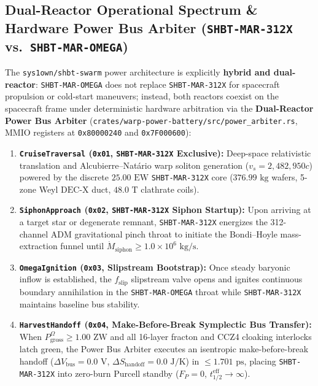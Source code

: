 \documentclass[11pt,onecolumn]{article}
\begin{document}
\subsection{Dual-Reactor Operational Spectrum \& Hardware Power Bus Arbiter (\texttt{SHBT-MAR-312X} vs.\ \texttt{SHBT-MAR-OMEGA})}
\label{sec:dual_reactor_arbiter}

The \texttt{sys1own/shbt-swarm} power architecture is explicitly \textbf{hybrid and dual-reactor}: \texttt{SHBT-MAR-OMEGA} does not replace \texttt{SHBT-MAR-312X} for spacecraft propulsion or cold-start maneuvers; instead, both reactors coexist on the spacecraft frame under deterministic hardware arbitration via the \textbf{Dual-Reactor Power Bus Arbiter} (\texttt{crates/warp-power-battery/src/power\_arbiter.rs}, MMIO registers at \texttt{0x80000240} and \texttt{0x7F000600}):
\begin{enumerate}
    \item \textbf{\texttt{CruiseTraversal} (\texttt{0x01}, \texttt{SHBT-MAR-312X} Exclusive):} Deep-space relativistic translation and Alcubierre--Nat\'ario warp soliton generation ($v_s = 2{,}482{,}950c$) powered by the discrete $25.00\text{ EW}$ \texttt{SHBT-MAR-312X} core ($376.99\text{ kg}$ wafers, 5-zone Weyl $\text{DEC-X}$ duct, $48.0\text{ T}$ clathrate coils).
    \item \textbf{\texttt{SiphonApproach} (\texttt{0x02}, \texttt{SHBT-MAR-312X} Siphon Startup):} Upon arriving at a target star or degenerate remnant, \texttt{SHBT-MAR-312X} energizes the 312-channel ADM gravitational pinch throat to initiate the Bondi--Hoyle mass-extraction funnel until $\dot{M}_{\text{siphon}} \ge 1.0 \times 10^6\text{ kg/s}$.
    \item \textbf{\texttt{OmegaIgnition} (\texttt{0x03}, Slipstream Bootstrap):} Once steady baryonic inflow is established, the $f_{\text{slip}}$ slipstream valve opens and ignites continuous boundary annihilation in the \texttt{SHBT-MAR-OMEGA} throat while \texttt{SHBT-MAR-312X} maintains baseline bus stability.
    \item \textbf{\texttt{HarvestHandoff} (\texttt{0x04}, Make-Before-Break Symplectic Bus Transfer):} When $P_{\text{gross}}^{\Omega} \ge 1.00\text{ ZW}$ and all 16-layer fracton and CCZ4 cloaking interlocks latch green, the Power Bus Arbiter executes an isentropic make-before-break handoff ($\Delta V_{\text{bus}} = 0.0\text{ V}$, $\Delta S_{\text{handoff}} = 0.0\text{ J/K}$) in $\le 1.701\text{ ps}$, placing \texttt{SHBT-MAR-312X} into zero-burn Purcell standby ($F_P = 0$, $t_{1/2}^{\text{eff}} \to \infty$).

\end{enumerate}
\end{document}
